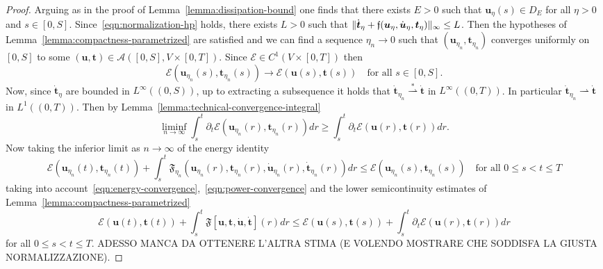 \begin{proof}
Arguing as in the proof of Lemma~\ref{lemma:dissipation-bound} one finds that there exists $E>0$ such that $\boldsymbol{u}_\eta(s)\in D_E$ for all $\eta>0$ and $s\in[0,S]$. Since~\eqref{eqn:normalization-hp} holds, there exists $L>0$ such that $\lVert\dot{\boldsymbol{t}}_\eta+\mathfrak{f}(\boldsymbol{u}_\eta,\dot{\boldsymbol{u}}_\eta,\boldsymbol{t}_\eta)\rVert_\infty\le L$. Then the hypotheses of Lemma~\ref{lemma:compactness-parametrized} are satisfied and we can find a sequence $\eta_n\to0$ such that $(\boldsymbol{u}_{\eta_n},\boldsymbol{t}_{\eta_n})$ converges uniformly on $[0,S]$ to some $(\boldsymbol{u},\boldsymbol{t})\in\mathscr{A}([0,S],V\times[0,T])$. Since $\mathcal{E}\in C^1(V\times[0,T])$ then
\begin{equation}
\label{eqn:energy-convergence}
\mathcal{E}(\boldsymbol{u}_{\eta_n}(s),\boldsymbol{t}_{\eta_n}(s))\to\mathcal{E}(\boldsymbol{u}(s),\boldsymbol{t}(s))\quad\text{for all $s\in[0,S]$}.
\end{equation}
Now, since $\dot{\boldsymbol{t}}_\eta$ are bounded in $L^\infty((0,S))$, up to extracting a subsequence it holds that $\dot{\boldsymbol{t}}_{\eta_n}\overset{*}{\rightharpoonup}\dot{\boldsymbol{t}}$ in $L^\infty((0,T))$. In particular $\dot{\boldsymbol{t}}_{\eta_n}\rightharpoonup\dot{\boldsymbol{t}}$ in $L^1((0,T))$. Then by Lemma~\ref{lemma:technical-convergence-integral}
\begin{equation}
\label{eqn:power-convergence}
\liminf_{n\to\infty}\int_s^t\partial_t\mathcal{E}(\boldsymbol{u}_{\eta_n}(r),\boldsymbol{t}_{\eta_n}(r))dr\ge\int_s^t\partial_t\mathcal{E}(\boldsymbol{u}(r),\boldsymbol{t}(r))dr.
\end{equation}
Now taking the inferior limit as $n\to\infty$ of the energy identity
\[
\mathcal{E}(\boldsymbol{u}_{\eta_n}(t),\boldsymbol{t}_{\eta_n}(t))+\int_s^t\mathfrak{F}_{\eta_n}(\boldsymbol{u}_{\eta_n}(r),\boldsymbol{t}_{\eta_n}(r),\dot{\boldsymbol{u}}_{\eta_n}(r),\dot{\boldsymbol{t}}_{\eta_n}(r))dr\le\mathcal{E}(\boldsymbol{u}_{\eta_n}(s),\boldsymbol{t}_{\eta_n}(s))\quad\text{for all $0\le s<t\le T$}
\]
taking into account~\eqref{eqn:energy-convergence},~\eqref{eqn:power-convergence} and the lower semicontinuity estimates of Lemma~\ref{lemma:compactness-parametrized}
\[
\mathcal{E}(\boldsymbol{u}(t),\boldsymbol{t}(t))+\int_s^t\mathfrak{F}[\boldsymbol{u},\boldsymbol{t},\dot{\boldsymbol{u}},\dot{\boldsymbol{t}}](r)dr\le\mathcal{E}(\boldsymbol{u}(s),\boldsymbol{t}(s))+\int_s^t\partial_t\mathcal{E}(\boldsymbol{u}(r),\boldsymbol{t}(r))dr
\]
for all $0\le s<t\le T$. ADESSO MANCA DA OTTENERE L'ALTRA STIMA (E VOLENDO MOSTRARE CHE SODDISFA LA GIUSTA NORMALIZZAZIONE).
\end{proof}

